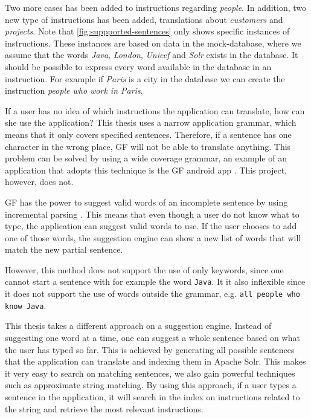 Two more cases has been added to instructions regarding \emph{people}. In addition, two new type of instructions has been added, translations about \emph{customers} and \emph{projects}. Note that \autoref{fig:suppported-sentences} only shows specific instances of instructions. These instances are based on data in the mock-database, where we assume that the words \emph{Java}, \emph{London}, \emph{Unicef} and \emph{Solr} exists in the database. It should be possible to express every word available in the database in an instruction. For example if \emph{Paris} is a city in the database we can create the instruction \emph{people who work in Paris}.

If a user has no idea of which instructions the application can translate, how can she use the application? This thesis uses a narrow application grammar, which means that it only covers specified sentences. Therefore, if a sentence has one character in the wrong place, GF will not be able to
translate anything. This problem can be solved by using a wide coverage grammar, an example of an application that adopts this technique is the GF android app \cite[p. 41]{angelov2014speech}. This project, however, does not.

GF has the power to suggest valid words of an incomplete sentence by using incremental parsing \cite{angelov09:incremental-parser}. This means that even though a user do not know what to type, the application can suggest valid words to use. If the user chooses to add one of those words, the suggestion engine can show a new list of words that will match the new partial sentence.

However, this method does not support the use of only keywords, since one cannot start a sentence with for example the word \texttt{Java}. It it also inflexible since it does not support the use of words outside the grammar, e.g. \texttt{all people who know Java}.

This thesis takes a different approach on a suggestion engine. Instead of suggesting one word at a time, one can suggest a whole sentence based on what the user has typed so far. This is achieved by generating all possible sentences that the application can translate and indexing them in Apache Solr. This makes it very easy to search on matching sentences, we also gain powerful techniques such as approximate string matching. 
\newline
\newline
By using this approach, if a user types a sentence in the application, it will search in the index on instructions related to the string and retrieve the most relevant instructions.

